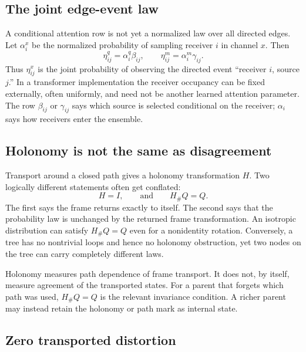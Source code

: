 \documentclass[11pt,letterpaper]{article}
\begin{document}
\subsection{The joint edge-event law}

A conditional attention row is not yet a normalized law over all directed edges. Let \(\alpha_i^x\) be the normalized probability of sampling receiver \(i\) in channel \(x\). Then
\begin{equation}
  \eta_{ij}^q=\alpha_i^q\beta_{ij},
  \qquad
  \eta_{ij}^m=\alpha_i^m\gamma_{ij}.
  \label{eq:eta}
\end{equation}
Thus \(\eta_{ij}^x\) is the joint probability of observing the directed event ``receiver \(i\), source \(j\).'' In a transformer implementation the receiver occupancy can be fixed externally, often uniformly, and need not be another learned attention parameter. The row \(\beta_{ij}\) or \(\gamma_{ij}\) says which source is selected conditional on the receiver; \(\alpha_i\) says how receivers enter the ensemble.

\subsection{Holonomy is not the same as disagreement}
\label{sec:holonomy}

Transport around a closed path gives a holonomy transformation \(H\). Two logically different statements often get conflated:
\[
  H=I,
  \qquad\text{and}\qquad
  H_{\#}Q=Q.
\]
The first says the frame returns exactly to itself. The second says that the probability law is unchanged by the returned frame transformation. An isotropic distribution can satisfy \(H_{\#}Q=Q\) even for a nonidentity rotation. Conversely, a tree has no nontrivial loops and hence no holonomy obstruction, yet two nodes on the tree can carry completely different laws.

\begin{translationbox}
Holonomy measures path dependence of frame transport. It does not, by itself, measure agreement of the transported states. For a parent that forgets which path was used, \(H_{\#}Q=Q\) is the relevant invariance condition. A richer parent may instead retain the holonomy or path mark as internal state.
\end{translationbox}

\subsection{Zero transported distortion}
\label{sec:zero-distortion}
\end{document}
